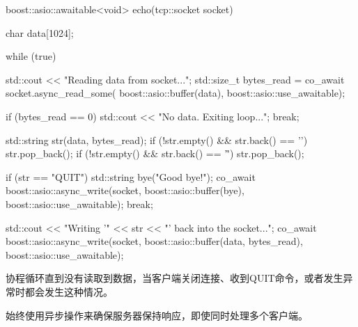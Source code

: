\begin{cpp}
boost::asio::awaitable<void> echo(tcp::socket socket) {
    char data[1024];

    while (true) {
        std::cout << "Reading data from socket...\n";
        std::size_t bytes_read = co_await
                 socket.async_read_some(
                        boost::asio::buffer(data),
                        boost::asio::use_awaitable);

        if (bytes_read == 0) {
            std::cout << "No data. Exiting loop...\n";
            break;
        }

        std::string str(data, bytes_read);
        if (!str.empty() && str.back() == '\n') {
            str.pop_back();
        }
        if (!str.empty() && str.back() == '\r') {
            str.pop_back();
        }

        if (str == "QUIT") {
            std::string bye("Good bye!\n");
            co_await boost::asio::async_write(socket,
                        boost::asio::buffer(bye),
                        boost::asio::use_awaitable);
            break;
        }

        std::cout << "Writing '" << str
                  << "' back into the socket...\n";
        co_await boost::asio::async_write(socket,
                    boost::asio::buffer(data,
                                        bytes_read),
                    boost::asio::use_awaitable);
    }
}
\end{cpp}

协程循环直到没有读取到数据，当客户端关闭连接、收到QUIT命令，或者发生异常时都会发生这种情况。

始终使用异步操作来确保服务器保持响应，即使同时处理多个客户端。


